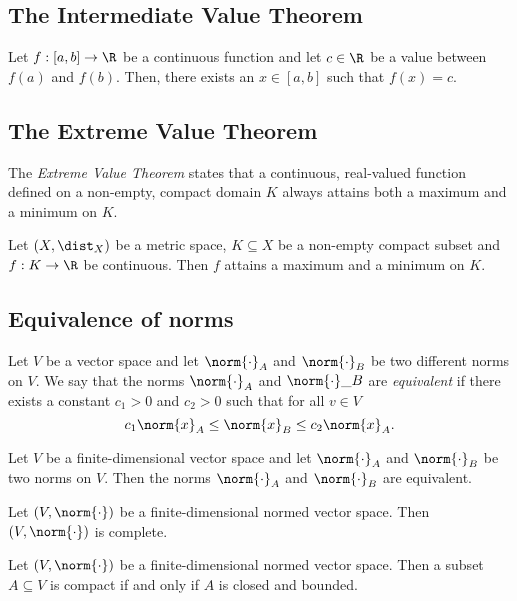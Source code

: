 \subsection{The Intermediate Value Theorem}
\begin{theorem}
    Let $f: [a,b] \to \R$ be a continuous function and let $c \in \R$ be a value between $f(a)$ and $f(b)$. Then,
    there exists an $x \in [a,b]$ such that $f(x) = c$.
\end{theorem}

\subsection{The Extreme Value Theorem}
The \emph{Extreme Value Theorem} states that a continuous, real-valued function defined on a non-empty, compact domain
$K$ always attains both a maximum and a minimum on $K$. 
\begin{theorem}
    Let $(X,\dist_X)$ be a metric space, $K \subseteq X$ be a non-empty compact subset and $f: K \to \R$ be continuous.
    Then $f$ attains a maximum and a minimum on $K$.
\end{theorem}

\subsection{Equivalence of norms}
\begin{definition}
    Let $V$ be a vector space and let $\norm{\cdot}_A$ and $\norm{\cdot}_B$ be two different norms on $V$. We say
    that the norms $\norm{\cdot}_A$ and $\norm{\cdot}\_B$ are \emph{equivalent} if there exists a constant $c_1 > 0$ and
    $c_2 > 0$ such that for all $v \in V$
    $$c_1\norm{x}_A \le \norm{x}_B \le c_2\norm{x}_A.$$
\end{definition}
\begin{theorem}
    Let $V$ be a finite-dimensional vector space and let $\norm{\cdot}_A$ and $\norm{\cdot}_B$ be two norms on $V$.
    Then the norms $\norm{\cdot}_A$ and $\norm{\cdot}_B$ are equivalent.
\end{theorem}

\begin{theorem}
    Let $(V,\norm{\cdot})$ be a finite-dimensional normed vector space. Then $(V, \norm{\cdot})$ is complete.
\end{theorem}

\begin{theorem}
    Let $(V,\norm{\cdot})$ be a finite-dimensional normed vector space. Then a subset $A \subseteq V$ is compact
    if and only if $A$ is closed and bounded.
\end{theorem}

